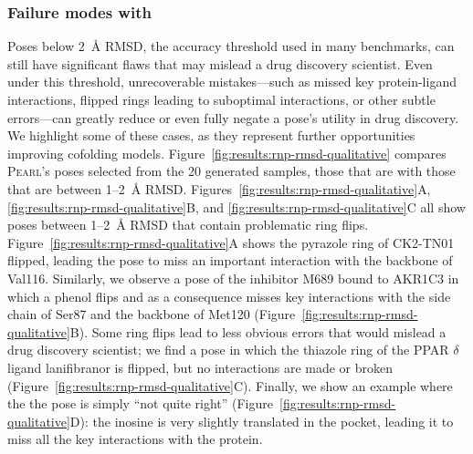 \documentclass[11pt, letterpaper, onecolumn]{tau-class/tau}
\newcommand{\pearl}{\textsc{Pearl}\xspace}
\newcommand{\rmsdonea}{\text{RMSD\,\raisebox{0.25ex}{\scriptsize <}\,1\,\AA}\xspace}
\newcommand{\rmsdtwoa}{\text{RMSD\,\raisebox{0.25ex}{\scriptsize <}\,2\,\AA}\xspace}
\let\oldAA\AA
\renewcommand{\AA}{\oldAA\xspace}
\begin{document}
\subsubsection{Failure modes with \rmsdtwoa}\vspace{-0.75ex}
Poses below 2~\AA RMSD, the accuracy threshold used in many benchmarks, can still have significant flaws that may mislead a drug discovery scientist.
Even under this threshold, unrecoverable mistakes---such as missed key protein-ligand interactions, flipped rings leading to suboptimal interactions, or other subtle errors---can greatly reduce or even fully negate a pose's utility in drug discovery.
We highlight some of these cases, as they represent further opportunities improving cofolding models.
Figure~\ref{fig:results:rnp-rmsd-qualitative} compares \pearl's poses selected from the 20 generated samples, those that are \rmsdonea with those that are between 1--2~\AA RMSD.
Figures~\ref{fig:results:rnp-rmsd-qualitative}A, \ref{fig:results:rnp-rmsd-qualitative}B, and \ref{fig:results:rnp-rmsd-qualitative}C all show poses between 1--2~\AA RMSD that contain problematic ring flips.
Figure~\ref{fig:results:rnp-rmsd-qualitative}A shows the pyrazole ring of CK2-TN01 flipped, leading the pose to miss an important interaction with the backbone of Val116.
Similarly, we observe a pose of the inhibitor M689 bound to AKR1C3 in which a phenol flips and as a consequence misses key interactions with the side chain of Ser87 and the backbone of Met120 (Figure~\ref{fig:results:rnp-rmsd-qualitative}B).
Some ring flips lead to less obvious errors that would mislead a drug discovery scientist; we find a pose in which the thiazole ring of the PPAR $\delta$ ligand lanifibranor is flipped, but no interactions are made or broken (Figure~\ref{fig:results:rnp-rmsd-qualitative}C).
Finally, we show an example where the the pose is simply ``not quite right'' (Figure~\ref{fig:results:rnp-rmsd-qualitative}D): the inosine is very slightly translated in the pocket, leading it to miss all the key interactions with the protein.
\end{document}

